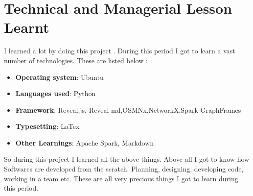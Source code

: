 
\section{Technical and Managerial Lesson Learnt}
I learned a lot by doing this project . During this period I got to learn a vast 
number of technologies. These are listed below :
\begin{itemize}
\item {\bf{Operating system}}: Ubuntu
\item {\bf{Languages used}}: Python
\item {\bf{Framework}}: Reveal.js, Reveal-md,OSMNx,NetworkX,Spark GraphFrames
\item {\bf{Typesetting}}: LaTex
\item {\bf{Other Learnings}}: Apache Spark, Markdown

\end{itemize}

So during this project I learned all the above things. Above all I got to know 
how Softwares are developed from the scratch. Planning, designing, developing code, 
working in a team etc. These are all very precious things I got to learn 
during this period.  


